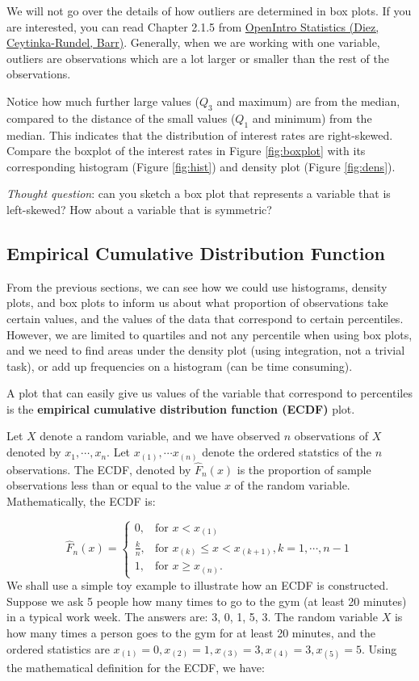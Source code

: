 \documentclass[
]{book}
\begin{document}
We will not go over the details of how outliers are determined in box plots. If you are interested, you can read Chapter 2.1.5 from \href{https://www.openintro.org/book/os/}{OpenIntro Statistics (Diez, Ceytinka-Rundel, Barr)}. Generally, when we are working with one variable, outliers are observations which are a lot larger or smaller than the rest of the observations.

Notice how much further large values (\(Q_3\) and maximum) are from the median, compared to the distance of the small values (\(Q_1\) and minimum) from the median. This indicates that the distribution of interest rates are right-skewed. Compare the boxplot of the interest rates in Figure \ref{fig:boxplot} with its corresponding histogram (Figure \ref{fig:hist}) and density plot (Figure \ref{fig:dens}).

\emph{Thought question}: can you sketch a box plot that represents a variable that is left-skewed? How about a variable that is symmetric?

\subsection{Empirical Cumulative Distribution Function}\label{ecdf}

From the previous sections, we can see how we could use histograms, density plots, and box plots to inform us about what proportion of observations take certain values, and the values of the data that correspond to certain percentiles. However, we are limited to quartiles and not any percentile when using box plots, and we need to find areas under the density plot (using integration, not a trivial task), or add up frequencies on a histogram (can be time consuming).

A plot that can easily give us values of the variable that correspond to percentiles is the \textbf{empirical cumulative distribution function (ECDF)} plot.

Let \(X\) denote a random variable, and we have observed \(n\) observations of \(X\) denoted by \(x_1, \cdots, x_n\). Let \(x_{(1)}, \cdots x_{(n)}\) denote the ordered statstics of the \(n\) observations. The ECDF, denoted by \(\hat{F}_n(x)\) is the proportion of sample observations less than or equal to the value \(x\) of the random variable. Mathematically, the ECDF is:

\[
 \hat{F}_n(x) = 
  \begin{cases} 
   0, & \text{for } x < x_{(1)} \\
   \frac{k}{n},       & \text{for } x_{(k)} \leq x < x_{(k+1)}, k = 1, \cdots, n-1\\
   1, & \text{for } x \geq x_{(n)}.
  \end{cases}
\]
We shall use a simple toy example to illustrate how an ECDF is constructed. Suppose we ask 5 people how many times to go to the gym (at least 20 minutes) in a typical work week. The answers are: 3, 0, 1, 5, 3. The random variable \(X\) is how many times a person goes to the gym for at least 20 minutes, and the ordered statistics are \(x_{(1)} = 0, x_{(2)} = 1, x_{(3)} = 3, x_{(4)} = 3, x_{(5)} = 5\). Using the mathematical definition for the ECDF, we have:
\end{document}
